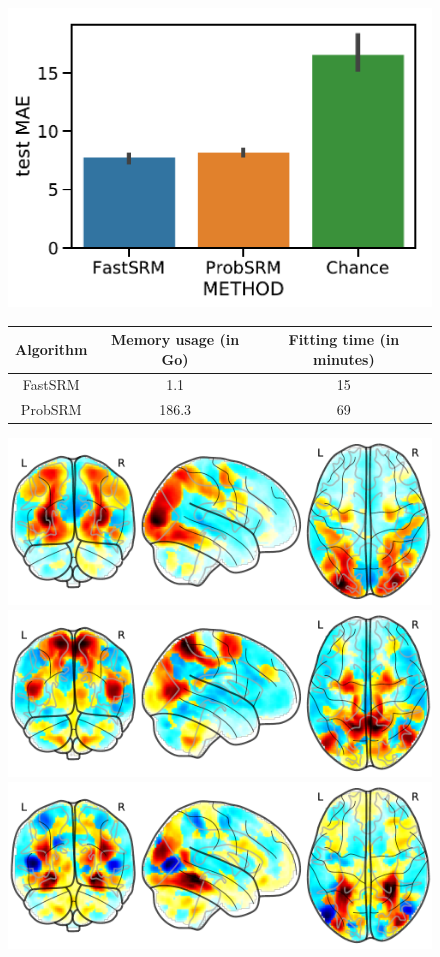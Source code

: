 \begin{figure}
\centering
\includegraphics[scale=0.44]{figures/srm/predict_age.pdf}

\begin{tabular}{|c|c|c|}
	\hline
	Algorithm & Memory usage (in Go) & Fitting time (in minutes) \\
	\hline
	FastSRM & 1.1 & 15 \\
	ProbSRM & 186.3 & 69 \\
	\hline
\end{tabular}
\includegraphics[scale=0.365]{./figures/srm/maps_feature_imp_0_16.pdf}
\includegraphics[scale=0.365]{./figures/srm/maps_feature_imp_0_12.pdf}
\includegraphics[scale=0.365]{./figures/srm/maps_feature_imp_0_08.pdf}


\end{figure}
